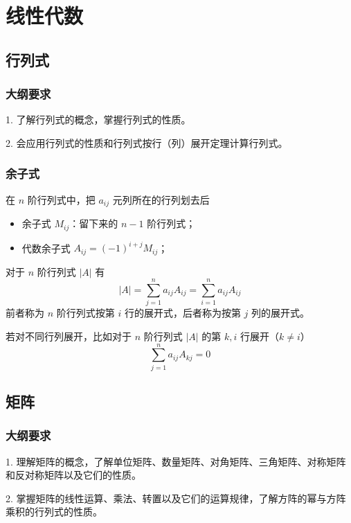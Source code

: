 \chapter{线性代数}

\newcommand{\transpose}[1]{{#1}^\mathsf{T}}

\section{行列式}

\subsection{大纲要求}

1. 了解行列式的概念，掌握行列式的性质。

2. 会应用行列式的性质和行列式按行（列）展开定理计算行列式。

\subsection{余子式}

在 $n$ 阶行列式中，把 $a_{ij}$ 元列所在的行列划去后
\begin{itemize}
	\item 余子式 $M_{ij}$：留下来的 $n-1$ 阶行列式；
	\item 代数余子式 $A_{ij} = (-1)^{i+j} M_{ij}$；
\end{itemize}

\begin{theorem}
	对于 $n$ 阶行列式 $|A|$ 有
	\[|A| = \sum_{j=1}^na_{ij}A_{ij} = \sum_{i=1}^na_{ij}A_{ij}\]
	前者称为 $n$ 阶行列式按第 $i$ 行的展开式，后者称为按第 $j$ 列的展开式。
\end{theorem}

若对不同行列展开，比如对于 $n$ 阶行列式 $|A|$ 的第 $k, i$ 行展开（$k \neq i$）
\[\sum_{j=1}^na_{ij}A_{kj} = 0 \]

\section{矩阵}

\subsection{大纲要求}

1. 理解矩阵的概念，了解单位矩阵、数量矩阵、对角矩阵、三角矩阵、对称矩阵和反对称矩阵以及它们的性质。

2. 掌握矩阵的线性运算、乘法、转置以及它们的运算规律，了解方阵的幂与方阵乘积的行列式的性质。

